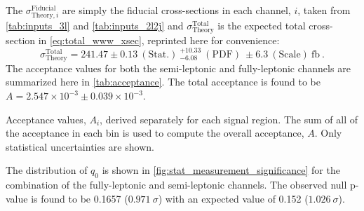 The $\sigma^{\textrm{Fiducial}}_{\textrm{Theory},i} $ are simply the fiducial
cross-sections in each channel, $i$,  taken from
\tab\ref{tab:inputs_3l} and \tab\ref{tab:inputs_2l2j}
and $\sigma^{\textrm{Total}}_{\textrm{Theory}}$ is the expected total cross-section
in \eqn\eqref{eq:total_www_xsec}, reprinted here for convenience:
\begin{equation}
\sigma^{\textrm{Total}}_{\textrm{Theory}}= 241.47\pm0.13 ~(\textrm{Stat.}) ~^{+10.33}_{-6.08} ~(\textrm{PDF}) ~\pm 6.3 ~(\textrm{Scale}) ~\textrm{fb} ~.
\end{equation}
The acceptance values for both the semi-leptonic and fully-leptonic channels 
are summarized here in \tab\ref{tab:acceptance}.
The total acceptance is found to be $A = 2.547 \times 10^{-3} \pm 0.039 \times 10^{-3}$.


\begin{table}[ht!]
\centering

\caption{Acceptance values, $A_i$, derived separately for each signal region. 
The sum of all of the acceptance
in each bin is used to compute the overall acceptance, $A$. 
Only statistical uncertainties are shown.}
\label{tab:acceptance}
\end{table}


The distribution of $q_0$ is shown 
in \fig\ref{fig:stat_measurement_significance} for the combination of the fully-leptonic and
semi-leptonic channels.
The observed null p-value 
is found to be 0.1657 ($0.971~\sigma$) with an 
expected value of 0.152 ($1.026~\sigma$).

